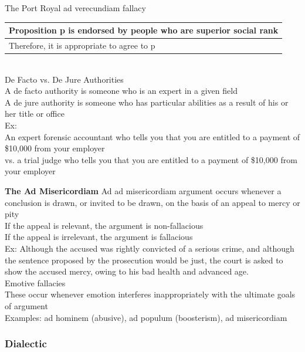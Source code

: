 \documentclass[11pt, fleqn]{article}
\begin{document}
The Port Royal ad verecundiam fallacy\\
\begin{tabular}{p{12cm}}
    Proposition p is endorsed by people who are superior social rank\\
    \hline
    Therefore, it is appropriate to agree to p
\end{tabular}\\

De Facto vs. De Jure Authorities\\
A de facto authority is someone who is an expert in a given field\\
A de jure authority is someone who has particular abilities as a result of his or her title or office\\

Ex:\\
An expert forensic accountant who tells you that you are entitled to a payment of \$10,000 from your employer\\
vs. a trial judge who tells you that you are entitled to a payment of \$10,000 from your employer

\textbf{The Ad Misericordiam}
Ad ad misericordiam argument occurs whenever a conclusion is drawn, or invited to be drawn, on the basis of an appeal to mercy or pity\\
If the appeal is relevant, the argument is non-fallacious\\
If the appeal is irrelevant, the argument is fallacious\\

Ex: Although the accused was rightly convicted of a serious crime, and although the sentence proposed by the prosecution would be just, the court is asked to show the accused mercy, owing to his bad health and advanced age.\\

Emotive fallacies\\
These occur whenever emotion interferes inappropriately with the ultimate goals of argument\\
Examples: ad hominem (abusive), ad populum (boosterism), ad misericordiam

\subsubsection{Dialectic}
\end{document}
